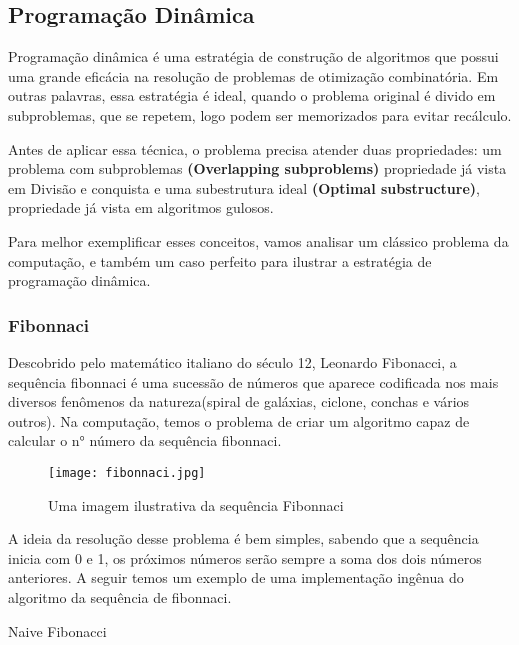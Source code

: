 
  \subsection{Programação Dinâmica}

    Programação dinâmica é uma estratégia de construção de algoritmos que 
    possui uma grande eficácia na resolução de problemas de otimização combinatória.
    Em outras palavras, essa estratégia é ideal, quando o problema original 
    é divido em subproblemas, que se repetem, logo podem ser memorizados para 
    evitar recálculo.

    Antes de aplicar essa técnica, o problema precisa atender duas propriedades:
    um problema com subproblemas \textbf{(Overlapping subproblems)} propriedade já vista 
    em Divisão e conquista e uma subestrutura ideal \textbf{(Optimal substructure)}, propriedade 
    já vista em algoritmos gulosos.

    Para melhor exemplificar esses conceitos, vamos analisar um clássico problema da computação, 
    e também um caso perfeito para ilustrar a estratégia de programação dinâmica.

    \subsubsection{Fibonnaci}

    Descobrido pelo matemático italiano do século 12, Leonardo Fibonacci, a sequência 
    fibonnaci é uma sucessão de números que aparece codificada nos mais diversos fenômenos 
    da natureza(spiral de galáxias, ciclone, conchas e vários outros). Na computação, temos 
    o problema de criar um algoritmo capaz de calcular o n° número da sequência fibonnaci.

    \begin{figure}[ht]
      \centering
      \texttt{[image: fibonnaci.jpg]}
      \caption{Uma imagem ilustrativa da sequência Fibonnaci}
      \label{fig:fibonnaci}
    \end{figure}

    A ideia da resolução desse problema é bem simples, sabendo que a sequência inicia com 0 e 1, os
    próximos números serão sempre a soma dos dois números anteriores. A seguir temos um exemplo 
    de uma implementação ingênua do algoritmo da sequência de fibonnaci. 

    \begin{algorithm}
      \caption{Naive Fibonacci} 
      \begin{algorithmic}[1]
      \EndIf
      \EndProcedure
      \end{algorithmic}
    \end{algorithm}

